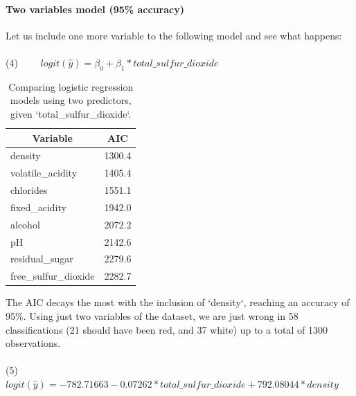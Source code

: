 \documentclass[10pt]{article}
\begin{document}
\paragraph{Two variables model (95\% accuracy)}
Let us include one more variable to the following model and see what happens:

\paragraph*{}
(4) \ \ \ \ $logit(\hat{y}) = \beta_0 + \beta_1*total\_sulfur\_dioxide$

\begin{table}[H]
	\centering
	\begin{tabular}{|l|l|}
		\hline
		\multicolumn{1}{|c|}{\textbf{Variable}} & \multicolumn{1}{c|}{\textbf{AIC}} \\ \hline
		density                                 & 1300.4                            \\ \hline
		volatile\_acidity                       & 1405.4                            \\ \hline
		chlorides                               & 1551.1                            \\ \hline
		fixed\_acidity                          & 1942.0                            \\ \hline
		alcohol                                 & 2072.2                            \\ \hline
		pH                                      & 2142.6                            \\ \hline
		residual\_sugar                         & 2279.6                            \\ \hline
		free\_sulfur\_dioxide                   & 2282.7                            \\ \hline
	\end{tabular}
	\caption{Comparing logistic regression models using two predictors, given `total\_sulfur\_dioxide`.}
	\label{table:two-predictors}
\end{table}


The AIC decays the most with the inclusion of `density`, reaching an accuracy of 95\%. Using just two variables of the dataset, we are just wrong in 58 classifications (21 should have been red, and 37 white) up to a total of 1300 observations.

\paragraph*{}
(5) \ \ \ $logit(\hat{y}) = -782.71663  -0.07262*total\_sulfur\_dioxide +792.08044  *density$
\end{document}
